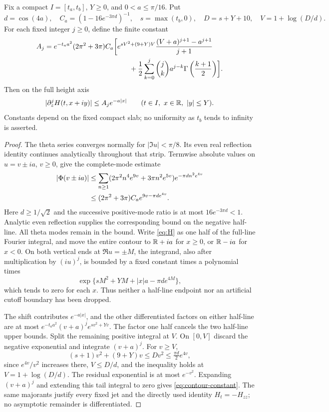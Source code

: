 \begin{lemma}\label{lem:contour-jets}
Fix a compact $I=[t_a,t_b]$, $Y\ge0$, and $0<a\le\pi/16$. Put
\[
 d=\cos(4a),\quad C_a=(1-16e^{-3\pi d})^{-1},\quad
 s=\max(t_b,0),\quad D=s+Y+10,\quad V=1+\log(D/d).
\]
For each fixed integer $j\ge0$, define the finite constant
\begin{align}
 A_j={}&e^{-t_aa^2}(2\pi^2+3\pi)C_a\biggl[
 e^{sV^2+(9+Y)V}\frac{(V+a)^{j+1}-a^{j+1}}{j+1}\notag\\
 &\hspace{38mm}
 +\frac12\sum_{k=0}^j\binom jk a^{j-k}
                     \Gamma\left(\frac{k+1}{2}\right)\biggr].
 \label{eq:contour-constant}
\end{align}
Then on the full height axis
\begin{equation}
 |\partial_z^jH(t,x+iy)|\le A_je^{-a|x|}
 \qquad(t\in I,\ x\in\mathbb R,\ |y|\le Y).
 \label{eq:contour-jets}
\end{equation}
Constants depend on the fixed compact slab; no uniformity as $t_b$ tends
to infinity is asserted.
\end{lemma}
\begin{proof}
The theta series converges normally for $|\Im u|<\pi/8$.
Its even real reflection identity continues analytically throughout that
strip. Termwise absolute values on $u=v\pm ia$, $v\ge0$, give the
complete-mode estimate
\begin{align}
 |\Phi(v\pm ia)|
 &\le\sum_{n\ge1}(2\pi^2n^4e^{9v}+3\pi n^2e^{5v})
                              e^{-\pi d n^2e^{4v}}\notag\\
 &\le(2\pi^2+3\pi)C_a e^{9v-\pi d e^{4v}}.
 \label{eq:contour-source-envelope}
\end{align}
Here $d\ge1/\sqrt2$ and the successive positive-mode ratio is at most
$16e^{-3\pi d}<1$. Analytic even reflection supplies the corresponding
bound on the negative half-line. All theta modes remain in the bound.
Write \eqref{eq:H} as one half of the full-line Fourier integral, and
move the entire contour to $\mathbb R+ia$ for $x\ge0$, or $\mathbb R-ia$ for $x<0$.
On both vertical ends at $\Re u=\pm M$, the integrand, also after
multiplication by $(iu)^j$, is bounded by a fixed constant times a
polynomial times
\[
 \exp\{sM^2+YM+|x|a-\pi d e^{4M}\},
\]
which tends to zero for each $x$. Thus neither a half-line endpoint nor
an artificial cutoff boundary has been dropped.

The shift contributes $e^{-a|x|}$, and the other differentiated factors
on either half-line are at most
$e^{-t_aa^2}(v+a)^je^{sv^2+Yv}$. The factor one half cancels the two
half-line upper bounds. Split the remaining positive integral at $V$.
On $[0,V]$ discard the negative exponential and integrate $(v+a)^j$.
For $v\ge V$,
\[
 (s+1)v^2+(9+Y)v\le Dv^2\le\tfrac{\pi d}{2}e^{4v},
\]
since $e^{4v}/v^2$ increases there, $V\le D/d$, and the inequality
holds at $V=1+\log(D/d)$. The residual exponential is at most $e^{-v^2}$.
Expanding $(v+a)^j$ and extending this tail integral to zero gives
\eqref{eq:contour-constant}. The same majorants justify every fixed jet
and the directly used identity $H_t=-H_{zz}$; no asymptotic remainder is
differentiated.
\end{proof}

